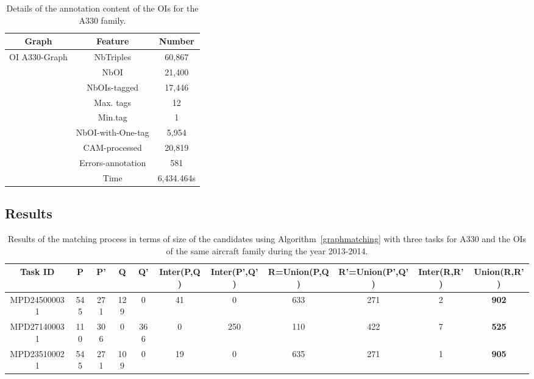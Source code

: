 \documentclass[runningheads,a4paper]{{llncs}}
\begin{document}
\begin{table}
\centering
\begin{tabular}{|c|c|c|}
\hline 
Graph & Feature & Number \\ 
\hline 
 \multirow{10}{*}{OI A330-Graph} & NbTriples & 60,867 \\ 
 
 & NbOI & 21,400 \\ 
 
 & NbOIs-tagged & 17,446\\ 
 
 & Max. tags & 12 \\ 
 
 & Min.tag & 1\\ 
 
 & NbOI-with-One-tag & 5,954 \\ 
 
 & CAM-processed & 20,819 \\ 
 
 & Errors-annotation & 581 \\ 
 
 & Time & 6,434.464s \\ 
\hline 
\end{tabular}
\caption{Details of the annotation content of the OIs for the A330 family.}
\label{tab:grapha330}
\end{table}
 
\subsection{Results}
\label{sec:results}

\begin{table}[!htp]
\scriptsize
\centering

\begin{tabular}{|c|c|c|c|c|c|c|c|c|c|c|} 
\hline 
Task ID & P & P' & Q & Q' & Inter(P,Q) & Inter(P',Q') & R=Union(P,Q) & R'=Union(P',Q') & Inter(R,R') & Union(R,R') \\ 
\hline 
MPD245000031 & 545 & 271 & 129 & 0 & 41 & 0 & 633 & 271 & 2 & \textbf{902}\\ 
\hline 
MPD271400031 & 110 & 306 & 0 & 366 & 0 & 250 & 110 & 422 & 7 & \textbf{525} \\ 
\hline 
MPD235100021 & 545 & 271 & 109 & 0 & 19 & 0 & 635 & 271 & 1 & \textbf{905} \\  
\hline 
\end{tabular} 
\caption{Results of the matching process in terms of size of the candidates using Algorithm~\ref{graphmatching} with three tasks for A330 and the OIs of the same aircraft family during the year 2013-2014.}
\label{tab:algo1}
\end{table}
\end{document}
